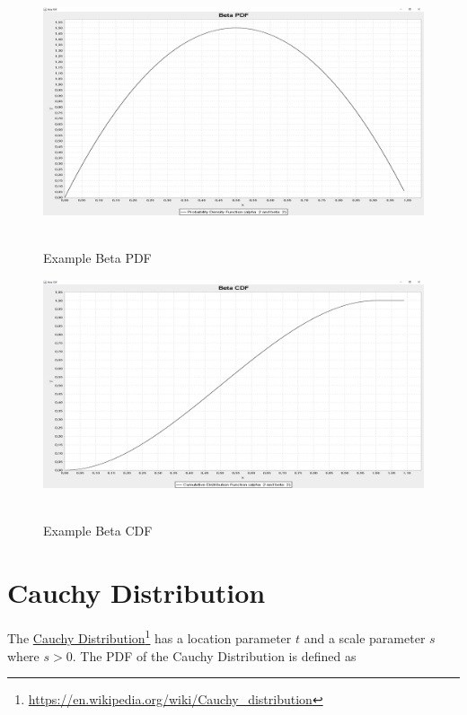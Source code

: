 		\begin{figure}[H]
			\centering
			\includegraphics[width=1\textwidth]{Figures/implemented_functions/beta_pdf}~\\
			\caption{Example Beta PDF}
			\label{fig:beta_pdf}
		\end{figure}

		\begin{figure}[H]
			\centering
			\includegraphics[width=1\textwidth]{Figures/implemented_functions/beta_cdf}~\\
			\caption{Example Beta CDF}
			\label{fig:beta_cdf}
		\end{figure}



	\section{Cauchy Distribution}

		The \href{https://en.wikipedia.org/wiki/Cauchy_distribution}{Cauchy Distribution}\footnote{\url{https://en.wikipedia.org/wiki/Cauchy_distribution}} has a location parameter $t$ and a scale parameter $s$ where $s > 0$. The \ac{PDF} of the Cauchy Distribution is defined as

